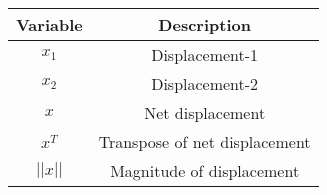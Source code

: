 \begin{tabular}[12pt]{ |c| c|}
    \hline
    \textbf{Variable} & \textbf{Description}\\ 
    \hline
    $x_1$ & Displacement-1 \\
    \hline 
    $x_2$ & Displacement-2 \\
    \hline
     $x$ & Net displacement \\
     \hline
     $x^T$ & Transpose of net displacement \\
    \hline
    $||x||$ & Magnitude of displacement \\
    \hline
    \end{tabular}

